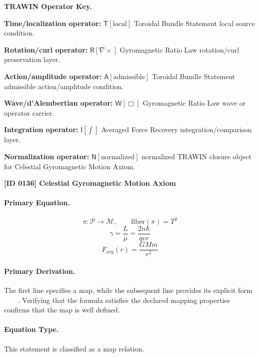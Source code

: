 \par\vspace{0.45\baselineskip}
\noindent\begin{minipage}[t]{\linewidth}
\begingroup
\small
\raggedright
\textbf{TRAWIN Operator Key.}\par
\noindent\textbf{Time/localization operator:} $\mathsf{T}\!\left[\mathrm{local}\right]$ Toroidal Bundle Statement local source condition.\par
\noindent\textbf{Rotation/curl operator:} $\mathsf{R}\!\left[\nabla\times\right]$ Gyromagnetic Ratio Law rotation/curl preservation layer.\par
\noindent\textbf{Action/amplitude operator:} $\mathsf{A}\!\left[\mathrm{admissible}\right]$ Toroidal Bundle Statement admissible action/amplitude condition.\par
\noindent\textbf{Wave/d'Alembertian operator:} $\mathsf{W}\!\left[\Box\right]$ Gyromagnetic Ratio Law wave or operator carrier.\par
\noindent\textbf{Integration operator:} $\mathsf{I}\!\left[\int\right]$ Averaged Force Recovery integration/comparison layer.\par
\noindent\textbf{Normalization operator:} $\mathsf{N}\!\left[\mathrm{normalized}\right]$ normalized TRAWIN closure object for Celestial Gyromagnetic Motion Axiom.\par
\endgroup
\end{minipage}

\clearpage
\noindent\textbf{[ID 0136] Celestial Gyromagnetic Motion Axiom}\par
\vspace{0.35em}
\paragraph{Primary Equation.}
\[
\pi:\mathcal{P}\to \mathcal{M},
\qquad
\mathrm{fiber}(\pi)=T^2
\]
\[
\gamma=\frac{L}{\mu}=\frac{2n\hbar}{qvr}
\]
\[
F_{\mathrm{avg}}(r)=\frac{GMm}{r^2}
\]

\paragraph{Primary Derivation.}
The first line specifies a map, while the subsequent line provides its explicit form \( \qquad \). Verifying that the formula satisfies the declared mapping properties confirms that the map is well defined.
\paragraph{Equation Type.}
This statement is classified as a map relation.

